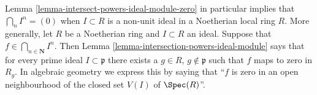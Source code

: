 \begin{remark}
\label{remark-intersection-powers-ideal}
Lemma \ref{lemma-intersect-powers-ideal-module-zero} in particular implies
that $\bigcap_n I^n = (0)$ when $I \subset R$ is a non-unit ideal in a
Noetherian local ring $R$. More generally, let $R$ be a Noetherian ring and
$I \subset R$ an ideal. Suppose that $f \in \bigcap_{n \in \mathbf{N}} I^n$.
Then Lemma \ref{lemma-intersection-powers-ideal-module}
says that for every prime ideal $I \subset \mathfrak p$
there exists a $g \in R$, $g \not \in \mathfrak p$
such that $f$ maps to zero in $R_g$. In algebraic geometry we
express this by saying that ``$f$ is zero in an open neighbourhood
of the closed set $V(I)$ of $\Spec(R)$''.
\end{remark}